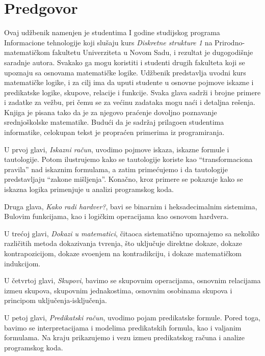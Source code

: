 \chapter*{Predgovor}

Ovaj ud\v zbenik namenjen je studentima I godine studijskog programa Informacione tehnologije koji slu\v saju kurs {\it Diskretne strukture 1} na Prirodno-matemati\v ckom fakultetu Univerziteta u Novom Sadu, i rezultat je dugogodi\v snje saradnje autora. Svakako ga mogu koristiti i studenti drugih fakulteta koji se upoznaju sa osnovama matemati\v cke logike. Ud\v zbenik predstavlja uvodni kurs matemati\v cke logike, i za cilj ima da uputi studente u osnovne pojmove iskazne i predikatske logike, skupove, relacije i funkcije. Svaka glava sadr\v zi i brojne primere i zadatke za ve\v zbu, pri \v cemu se za ve\' cinu zadataka mogu na\' ci i detaljna re\v senja. Knjiga je pisana tako da je za njegovo pra\' cenje dovoljno poznavanje srednjo\v skolske matematike. Budu\' ci da je sadr\v zaj prilago\dj en studentima informatike, celokupan tekst je propra\' cen primerima iz programiranja.

\bigskip

U prvoj glavi, {\it Iskazni ra\v cun}, uvodimo pojmove iskaza, iskazne formule i tautologije. Potom ilustrujemo kako se tautologije koriste kao \enquote{transformaciona pravila} nad iskaznim formulama, a zatim prime\' cujemo i da tautologije predstavljaju \enquote{zakone mi\v sljenja}. Kona\v cno, kroz primere se pokazuje kako se iskazna logika primenjuje u analizi programskog koda.

Druga glava, {\it Kako radi hardver?}, bavi se binarnim i heksadecimalnim sistemima, Bulovim funkcijama, kao i logi\v ckim operacijama kao osnovom hardvera.

U tre\' coj glavi, {\it Dokazi u matematici}, \v citaoca sistemati\v cno upoznajemo sa nekoliko razli\v citih metoda dokazivanja tvr\dj enja, \v sto uklju\v cuje direktne dokaze, dokaze kontrapozicijom, dokaze svo\dj enjem na kontradikciju, i dokaze matemati\v ckom indukcijom.

U \v cetvrtoj glavi, {\it Skupovi}, bavimo se skupovnim operacijama, osnovnim relacijama izme\dj u skupova, skupovnim jednakostima, osnovnim osobinama skupova i principom uklju\-\v ce\-nja-is\-klju\-\v ce\-nja.

U petoj glavi, {\it Predikatski ra\v cun}, uvodimo pojam predikatske formule. Pored toga, bavimo se interpretacijama i modelima predikatskih formula, kao i valjanim formulama. Na kraju prikazujemo i vezu izme\dj u predikatskog ra\v cuna i analize programskog koda.

